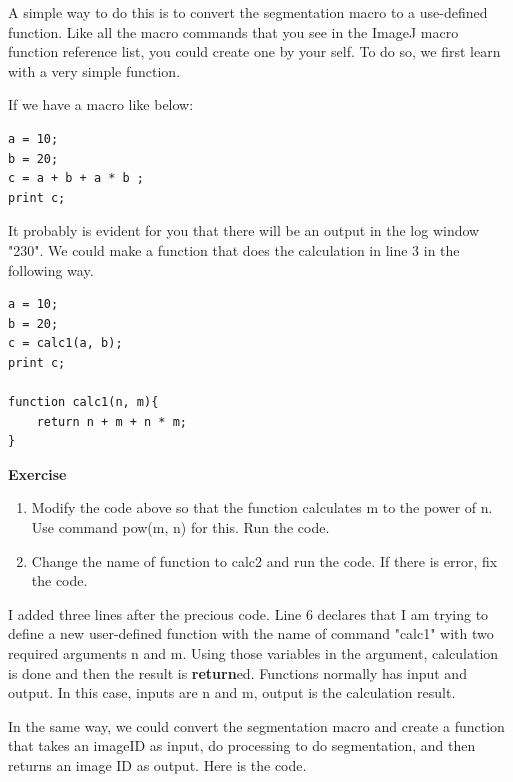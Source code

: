 \documentclass[11pt,a4paper,oneside]{report}
\newenvironment{indentexercise}[1]
{{\setlength{\leftmargin}{2em}}
\textbf{Exercise \thesubsection-#1}
\begin{list}{}
	\item
}
{\end{list}}
\begin{document}
A simple way to do this is to convert the segmentation macro to a use-defined function. Like all the macro commands that you see in the ImageJ macro function reference list, you could create one by your self. To do so, we first learn with a very simple function. 

If we have a macro like below:

\begin{lstlisting}
a = 10;
b = 20;
c = a + b + a * b ;
print c;
\end{lstlisting}

It probably is evident for you that there will be an output in the log window "230". We could make a function that does the calculation in line 3 in the following way.

\begin{lstlisting}[morekeywords={*, function, return}]
a = 10;
b = 20;
c = calc1(a, b);
print c;

function calc1(n, m){
	return n + m + n * m;
}
\end{lstlisting}

\begin{indentexercise}{3}
\begin{enumerate}
\item Modify the code above so that the function calculates m to the power of n. Use command pow(m, n) for this. Run the code. 

\item Change the name of function to calc2 and run the code. If there is error, fix the code. 
\end{enumerate}

\end{indentexercise}

I added three lines after the precious code. Line 6 declares that I am trying to define a new user-defined function with the name of command "calc1" with two required arguments n and m. Using those variables in the argument, calculation is done and then the result is \textbf{return}ed. Functions normally has input and output. In this case, inputs are n and m, output is the calculation result. 

In the same way, we could convert the segmentation macro and create a function that takes an imageID as input, do processing to do segmentation, and then returns an image ID as output. Here is the code. 
\end{document}
